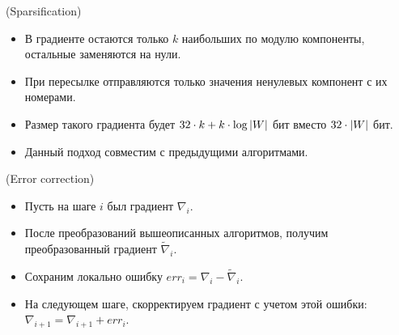 \begin{algorithm}(Sparsification)
  \begin{itemize}
    \item В градиенте остаются только $k$ наибольших по модулю компоненты,
      остальные заменяются на нули.
    \item При пересылке отправляются только значения ненулевых компонент с
      их номерами.
    \item Размер такого градиента будет $32 \cdot k  + k \cdot \log{\lvert W\rvert}$
      бит вместо $32 \cdot \lvert W\rvert$ бит.
    \item Данный подход совместим с предыдущими алгоритмами.
  \end{itemize}
\end{algorithm}

\begin{algorithm}(Error correction)
  \begin{itemize}
    \item Пусть на шаге $i$ был градиент $\nabla_i$.
    \item После преобразований вышеописанных алгоритмов, получим преобразованный
      градиент $\tilde{\nabla}_i$.
    \item Сохраним локально ошибку $err_i = \nabla_i - \tilde{\nabla}_i$.
    \item На следующем шаге, скорректируем градиент с учетом этой ошибки:
      $\nabla_{i + 1} = \nabla_{i + 1} + err_i$.
  \end{itemize}
\end{algorithm}
